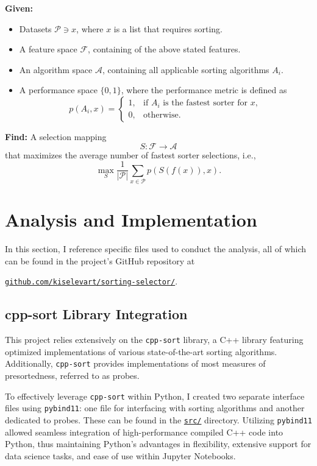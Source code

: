\documentclass[twocolumn]{article}
\newcommand{\vsp}{\vspace{0.5em}}
\begin{document}
\vsp

\noindent \textbf{Given:}
\begin{itemize}[itemsep=0.05em, topsep=0pt]
    \item Datasets $\mathcal{P} \ni x$, where $x$ is a list that requires sorting.
    \item A feature space $\mathcal{F}$, containing of the above stated features.
    \item An algorithm space $\mathcal{A}$, containing all applicable sorting algorithms $A_i$.
    \item A performance space $\{0,1\}$, where the performance metric is defined as
    \[
    p(A_i, x) = 
    \begin{cases}
    1, & \text{if } A_i \text{ is the fastest sorter for } x, \\
    0, & \text{otherwise.}
    \end{cases}
    \]
\end{itemize}

\noindent \textbf{Find:} A selection mapping
\[
S: \mathcal{F} \rightarrow \mathcal{A}
\]
that maximizes the average number of fastest sorter selections, i.e.,
\[
\max_{S} \frac{1}{|\mathcal{P}|} \sum_{x \in \mathcal{P}} p(S(f(x)), x).
\]

\section{Analysis and Implementation}
In this section, I reference specific files used to conduct the analysis, all of which can be found in the project's GitHub repository at 

\begin{center}
\href{https://github.com/kiselevart/sorting-selector/}{\texttt{github.com/kiselevart/sorting-selector/}}.
\end{center}

\subsection{cpp-sort Library Integration}
This project relies extensively on the \texttt{cpp-sort}\cite{cppsort_benchmarks} library, a C++ library featuring optimized implementations of various state-of-the-art sorting algorithms. Additionally, \texttt{cpp-sort} provides implementations of most measures of presortedness, referred to as probes.

To effectively leverage \texttt{cpp-sort} within Python, I created two separate interface files using \texttt{pybind11}: one file for interfacing with sorting algorithms and another dedicated to probes. These can be found in the \href{https://github.com/kiselevart/sorting-selector/tree/main/Implementation/src}{\texttt{src/}} directory. Utilizing \texttt{pybind11} allowed seamless integration of high-performance compiled C++ code into Python, thus maintaining Python's advantages in flexibility, extensive support for data science tasks, and ease of use within Jupyter Notebooks.
\end{document}

